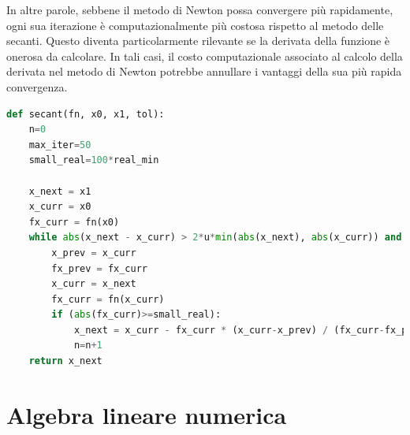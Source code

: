 \documentclass{article}
\begin{document}
In altre parole, sebbene il metodo di Newton possa convergere più rapidamente,
ogni sua iterazione è computazionalmente più costosa rispetto al metodo delle
secanti. Questo diventa particolarmente rilevante se la derivata della
funzione è onerosa da calcolare. In tali casi, il costo computazionale
associato al calcolo della derivata nel metodo di Newton potrebbe annullare i
vantaggi della sua più rapida convergenza.

\begin{lstlisting}[language=Python]
def secant(fn, x0, x1, tol):
    n=0
    max_iter=50
    small_real=100*real_min
    
    x_next = x1
    x_curr = x0
    fx_curr = fn(x0)
    while abs(x_next - x_curr) > 2*u*min(abs(x_next), abs(x_curr)) and n < max_iter:
        x_prev = x_curr
        fx_prev = fx_curr
        x_curr = x_next
        fx_curr = fn(x_curr)
        if (abs(fx_curr)>=small_real):
            x_next = x_curr - fx_curr * (x_curr-x_prev) / (fx_curr-fx_prev)
            n=n+1
    return x_next
\end{lstlisting}
\newpage
\section{Algebra lineare numerica}
\end{document}
